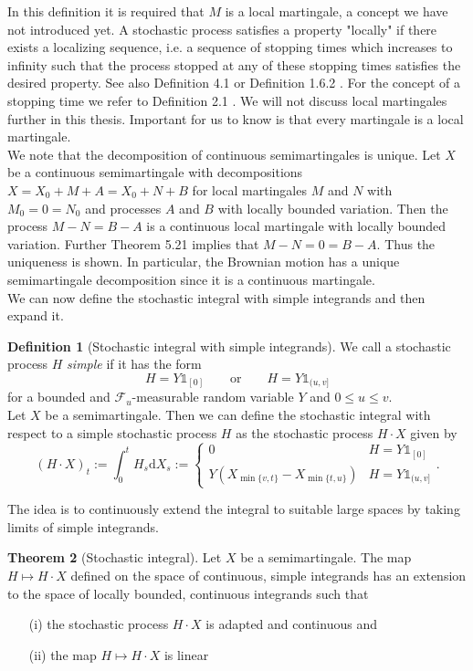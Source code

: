 \documentclass[11pt,titlepage]{article}
\theoremstyle{definition}
\newtheorem{theorem}{Theorem}[section]
\newtheorem{definition}[theorem]{Definition}
\theoremstyle{remark}
\begin{document}
	In this definition it is required that $M$ is a local martingale, a concept we have not introduced 
	yet. A stochastic process satisfies a property "locally" if there exists a localizing sequence, i.e. a sequence of stopping times which increases to infinity such that the process stopped at any of these stopping times satisfies the desired property. See also Definition 4.1 \cite{StoProSchmidt2021} or Definition 1.6.2 \cite{StoProTappe2018}. For the concept of a stopping time we refer to Definition 2.1 \cite{StoProSchmidt2021}. We will not discuss local martingales further in this thesis. Important for us to know is that every martingale is a local martingale.\\
	We note that the decomposition of continuous semimartingales is unique. 
	Let $X$ be a continuous semimartingale with decompositions $X=X_0 + M + A = X_0 + N + B$ for local martingales 
	$M$ and $N$ with $M_0=0=N_0$ and processes $A$ and $B$ with locally bounded variation. Then the process $M-N = B-A$ is a continuous local martingale with locally bounded variation. Further Theorem 
	5.21 \cite{StoProSchmidt2021} implies that $M-N = 0 = B-A$. Thus the uniqueness is shown.
	In particular, the Brownian motion has a unique semimartingale decomposition since it is 
	a continuous martingale.\\
	We can now define the stochastic integral with simple integrands and then expand it. 
	\clearpage
	\begin{definition}[Stochastic integral with simple integrands]
		We call a stochastic process $H$ \textsl{simple} if it has the form 
		\[H = Y \mathds{1}_{[0]} \qquad \text{or}\qquad H = Y\mathds{1}_{(u,v]}\]
		for a bounded and $\mathcal{F}_u$-measurable random variable $Y$ and $0\leq u\leq v$. \\
		Let $X$ be a semimartingale. Then we can define the stochastic integral with respect 
		to a simple stochastic process $H$ as the stochastic process $H\cdot X$ given by
		\[ (H\cdot X)_t := \int_0^t H_s \mathrm{d}X_s := \begin{cases}
			0 & H=Y \mathds{1}_{[0]} \\
			Y\left(X_{\min\{v,t\}} - X_{\min\{t, u\}}\right) & H = Y\mathds{1}_{(u,v]}
		\end{cases}.\]
	\end{definition}

	The idea is to continuously extend the integral to suitable large spaces by taking limits of simple integrands.
	
	\begin{theorem}[Stochastic integral]
		Let $X$ be a semimartingale. The map $H\mapsto H\cdot X$ defined on the 
		space of continuous, simple integrands has an extension to the space of locally bounded, continuous integrands such that 
		\begin{itemize}
			\item[(i)] the stochastic process $H\cdot X$ is adapted and continuous and
			\item[(ii)] the map $H\mapsto H\cdot X$ is linear
		\end{itemize}
	\end{theorem}
	
\end{document}
